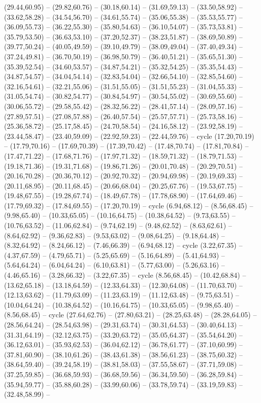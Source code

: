 {(29.44,60.95) -- (29.82,60.76) -- (30.18,60.14) -- (31.69,59.13) -- (33.50,58.92) -- (33.62,58.28) -- (34.54,56.70) -- (34.61,55.74) -- (35.06,55.38) -- (35.53,55.77) -- (36.09,55.73) -- (36.22,55.30) -- (35.80,54.63) -- (36.10,54.07) -- (35.73,53.81) -- (35.79,53.50) -- (36.63,53.10) -- (37.20,52.37) -- (38.23,51.87) -- (38.69,50.89) -- (39.77,50.24) -- (40.05,49.59) -- (39.10,49.79) -- (38.09,49.04) -- (37.40,49.34) -- (37.24,49.81) -- (36.70,50.19) -- (36.98,50.79) -- (36.40,51.21) -- (35.65,51.30) -- (35.39,52.54) -- (34.60,53.57) -- (34.87,54.21) -- (35.32,54.25) -- (35.35,54.43) -- (34.87,54.57) -- (34.04,54.14) -- (32.83,54.04) -- (32.66,54.10) -- (32.85,54.60) -- (32.16,54.61) -- (32.21,55.06) -- (31.51,55.05) -- (31.51,55.23) -- (31.04,55.33) -- (31.05,54.74) -- (30.82,54.77) -- (30.84,54.97) -- (30.54,55.02) -- (30.69,55.60) -- (30.06,55.72) -- (29.58,55.42) -- (28.32,56.22) -- (28.41,57.14) -- (28.09,57.16) -- (27.89,57.51) -- (27.08,57.88) -- (26.40,57.54) -- (25.57,57.71) -- (25.73,58.16) -- (25.36,58.72) -- (25.17,58.45) -- (24.70,58.54) -- (24.16,58.12) -- (23.92,58.19) -- (23.44,58.47) -- (23.40,59.09) -- (22.92,59.23) -- (22.44,59.76) -- cycle (17.20,70.19) -- (17.79,70.16) -- (17.69,70.39) -- (17.39,70.42) -- (17.48,70.74) -- (17.81,70.84) -- (17.47,71.22) -- (17.68,71.76) -- (17.97,71.32) -- (18.59,71.32) -- (18.79,71.53) -- (19.18,71.36) -- (19.31,71.68) -- (19.86,71.26) -- (20.01,70.48) -- (20.29,70.51) -- (20.16,70.28) -- (20.36,70.12) -- (20.92,70.32) -- (20.94,69.98) -- (20.19,69.33) -- (20.11,68.95) -- (20.11,68.45) -- (20.66,68.04) -- (20.25,67.76) -- (19.53,67.75) -- (19.48,67.55) -- (19.28,67.74) -- (18.49,67.78) -- (17.78,68.90) -- (17.64,69.46) -- (17.79,69.32) -- (17.84,69.55) -- (17.20,70.19) -- cycle (6.94,68.12) -- (8.56,68.45) -- (9.98,65.40) -- (10.33,65.05) -- (10.16,64.75) -- (10.38,64.52) -- (9.73,63.55) -- (10.76,63.52) -- (11.06,62.84) -- (9.74,62.19) -- (9.48,62.52) -- (8.63,62.61) -- (8.64,62.92) -- (9.36,62.83) -- (9.53,63.02) -- (9.08,64.25) -- (9.18,64.48) -- (8.32,64.92) -- (8.24,66.12) -- (7.46,66.39) -- (6.94,68.12) -- cycle (3.22,67.35) -- (4.37,67.59) -- (4.79,65.71) -- (5.25,65.69) -- (5.16,64.89) -- (5.41,64.93) -- (5.64,64.24) -- (6.04,64.24) -- (6.10,63.81) -- (5.77,63.00) -- (5.26,63.16) -- (4.46,65.16) -- (3.28,66.32) -- (3.22,67.35) -- cycle (8.56,68.45) -- (10.42,68.84) -- (13.62,65.18) -- (13.18,64.59) -- (12.33,64.33) -- (12.30,64.08) -- (11.70,63.70) -- (12.13,63.62) -- (11.79,63.09) -- (11.23,63.19) -- (11.12,63.48) -- (9.75,63.51) -- (10.04,64.24) -- (10.38,64.52) -- (10.16,64.75) -- (10.33,65.05) -- (9.98,65.40) -- (8.56,68.45) -- cycle (27.64,62.76) -- (27.80,63.21) -- (28.25,63.48) -- (28.28,64.05) -- (28.56,64.24) -- (28.54,63.98) -- (29.31,63.74) -- (30.31,64.53) -- (30.40,64.13) -- (31.31,64.19) -- (32.12,63.75) -- (33.20,63.72) -- (35.05,64.37) -- (35.54,64.20) -- (36.12,63.01) -- (35.93,62.53) -- (36.04,62.12) -- (36.78,61.77) -- (37.10,60.99) -- (37.81,60.90) -- (38.10,61.26) -- (38.43,61.38) -- (38.56,61.23) -- (38.75,60.32) -- (38.64,59.40) -- (39.24,58.19) -- (38.81,58.03) -- (37.55,58.67) -- (37.71,59.08) -- (37.25,59.85) -- (36.68,59.93) -- (36.68,59.56) -- (36.34,59.50) -- (36.28,59.84) -- (35.94,59.77) -- (35.88,60.28) -- (33.99,60.06) -- (33.78,59.74) -- (33.19,59.83) -- (32.48,58.99) -- }
